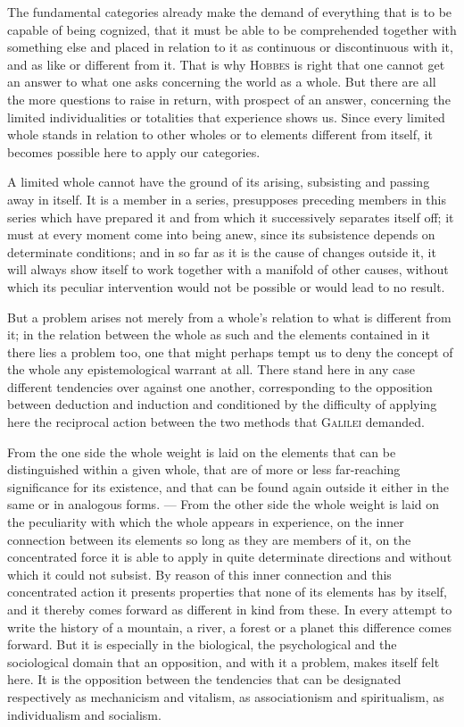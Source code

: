 \documentclass[12pt]{book}
\newcommand{\opage}[1]{\marginnote{\footnotesize\textit{[#1]}}}
\begin{document}
The fundamental categories already make the demand of everything that is to be
capable of being cognized, that it must be able to be comprehended together with
something else and placed in relation to it as continuous or discontinuous with
it, and as like or different from it. That is why \textsc{Hobbes} is right that
one cannot get an answer to what one asks concerning the world as a whole. But
there are all the more questions to raise in return, with prospect of an answer,
concerning the limited individualities or totalities that experience shows us.
Since every limited whole stands in relation to other wholes or to elements
different from itself, it becomes possible here to apply our categories.

A limited whole cannot have the ground of its arising, subsisting and passing
away in itself. It is a member in a series, presupposes preceding members in
this series which have prepared it and from which it successively separates
itself off; it must at every moment come into being anew, since its subsistence
depends on determinate conditions; and in so far as it is the cause of changes
outside it, it will always show itself to work together with a manifold of other
causes, without which \opage{22}its peculiar intervention would not be possible or would
lead to no result.

But a problem arises not merely from a whole's relation to what is different
from it; in the relation between the whole as such and the elements contained in
it there lies a problem too, one that might perhaps tempt us to deny the concept
of the whole any epistemological warrant at all. There stand here in any case
different tendencies over against one another, corresponding to the opposition
between deduction and induction and conditioned by the difficulty of applying
here the reciprocal action between the two methods that \textsc{Galilei}
demanded.

From the one side the whole weight is laid on the elements that can be
dis\-tin\-guished within a given whole, that are of more or less far-reaching
significance for its existence, and that can be found again outside it either in
the same or in analogous forms. --- From the other side the whole weight is laid
on the peculiarity with which the whole appears in experience, on the inner
connection between its elements so long as they are members of it, on the
concentrated force it is able to apply in quite determinate directions and
without which it could not subsist. By reason of this inner connection and this
concentrated action it presents properties that none of its elements has by
itself, and it thereby comes forward as different in kind from these. In every
attempt to write the history of a mountain, a river, a forest or a planet this
difference comes forward. But it is especially in the biological, the
psychological and the sociological domain that an opposition, and with it a
problem, makes itself felt here. It is the opposition between the tendencies
that can be designated respectively as mechanicism and vitalism, as
associationism and spiritualism, as individualism and socialism.
\end{document}
